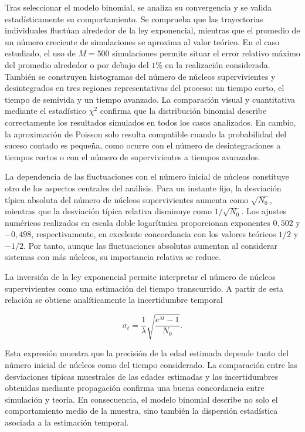 \documentclass[12pt,a4paper]{article}
\begin{document}
Tras seleccionar el modelo binomial, se analiza su convergencia y se valida estadísticamente su comportamiento. Se comprueba que las trayectorias individuales fluctúan alrededor de la ley exponencial, mientras que el promedio de un número creciente de simulaciones se aproxima al valor teórico. En el caso estudiado, el uso de $M=500$ simulaciones permite situar el error relativo máximo del promedio alrededor o por debajo del $1\%$ en la realización considerada. También se construyen histogramas del número de núcleos supervivientes y desintegrados en tres regiones representativas del proceso: un tiempo corto, el tiempo de semivida y un tiempo avanzado. La comparación visual y cuantitativa mediante el estadístico $\chi^2$ confirma que la distribución binomial describe correctamente los resultados simulados en todos los casos analizados. En cambio, la aproximación de Poisson solo resulta compatible cuando la probabilidad del suceso contado es pequeña, como ocurre con el número de desintegraciones a tiempos cortos o con el número de supervivientes a tiempos avanzados.

La dependencia de las fluctuaciones con el número inicial de núcleos constituye otro de los aspectos centrales del análisis. Para un instante fijo, la desviación típica absoluta del número de núcleos supervivientes aumenta como $\sqrt{N_0}$, mientras que la desviación típica relativa disminuye como $1/\sqrt{N_0}$. Los ajustes numéricos realizados en escala doble logarítmica proporcionan exponentes $0{,}502$ y $-0{,}498$, respectivamente, en excelente concordancia con los valores teóricos $1/2$ y $-1/2$. Por tanto, aunque las fluctuaciones absolutas aumentan al considerar sistemas con más núcleos, su importancia relativa se reduce.

La inversión de la ley exponencial permite interpretar el número de núcleos supervivientes como una estimación del tiempo transcurrido. A partir de esta relación se obtiene analíticamente la incertidumbre temporal

\begin{equation*}
\sigma_t=
\frac{1}{\lambda}
\sqrt{
\frac{e^{\lambda t}-1}{N_0}
}.
\end{equation*}

Esta expresión muestra que la precisión de la edad estimada depende tanto del número inicial de núcleos como del tiempo considerado. La comparación entre las desviaciones típicas muestrales de las edades estimadas y las incertidumbres obtenidas mediante propagación confirma una buena concordancia entre simulación y teoría. En consecuencia, el modelo binomial describe no solo el comportamiento medio de la muestra, sino también la dispersión estadística asociada a la estimación temporal.
\end{document}
